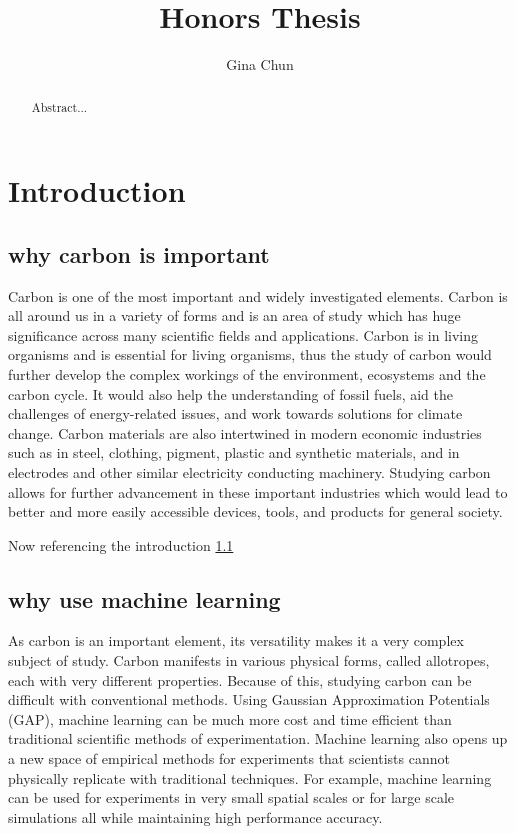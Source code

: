 \documentclass[12pt]{scrartcl}
\title{Honors Thesis}
\author{Gina Chun}
\begin{document}
\maketitle

\newpage

\begin{abstract}
  Abstract...
\end{abstract}

\newpage

\tableofcontents

\newpage

\section{Introduction}\label{Introduction}



\subsection{why carbon is important}\label{Test}


Carbon is one of the most important and widely investigated
elements. Carbon is all around us in a variety of forms and is an area
of study which has huge significance across many scientific fields and
applications. Carbon is in living organisms and is essential for
living organisms, thus the study of carbon would further develop the
complex workings of the environment, ecosystems and the carbon
cycle. It would also help the understanding of fossil fuels, aid the
challenges of energy-related issues, and work towards solutions for
climate change. Carbon materials are also intertwined in modern
economic industries such as in steel, clothing, pigment, plastic and
synthetic materials, and in electrodes and other similar electricity
conducting machinery. Studying carbon allows for further advancement
in these important industries which would lead to better and more
easily accessible devices, tools, and products for general society.

Now referencing the introduction \ref{Test}

\subsection{why use machine learning}
As carbon is an important element, its versatility makes it a very
complex subject of study. Carbon manifests in various physical forms,
called allotropes, each with very different properties. Because of
this, studying carbon can be difficult with conventional
methods. Using Gaussian Approximation Potentials (GAP), machine
learning can be much more cost and time efficient than traditional
scientific methods of experimentation. Machine learning also opens up
a new space of empirical methods for experiments that scientists
cannot physically replicate with traditional techniques. For example,
machine learning can be used for experiments in very small spatial
scales or for large scale simulations all while maintaining high
performance accuracy.
\end{document}
